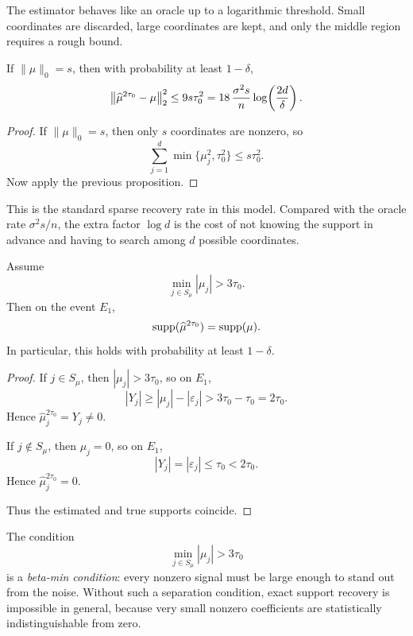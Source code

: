 \begin{remark}
The estimator behaves like an oracle up to a logarithmic threshold. Small coordinates are discarded, large coordinates are kept, and only the middle region requires a rough bound.
\end{remark}

\begin{cor}
If $\|\mu\|_0=s$, then with probability at least $1-\delta$,
\[
\left\lVert\widehat\mu^{2\tau_0}-\mu\right\rVert_2^2
\le
9s\tau_0^2
=
18\,\frac{\sigma^2 s}{n}\log\!\left(\frac{2d}{\delta}\right).
\]
\end{cor}

\begin{proof}
If $\|\mu\|_0=s$, then only $s$ coordinates are nonzero, so
\[
\sum_{j=1}^d \min\{\mu_j^2,\tau_0^2\}
\le
s\tau_0^2.
\]
Now apply the previous proposition.
\end{proof}

\begin{remark}
This is the standard sparse recovery rate in this model.
Compared with the oracle rate $\sigma^2 s/n$, the extra factor $\log d$ is the cost of not knowing the support in advance and having to search among $d$ possible coordinates.
\end{remark}


\begin{cor}
Assume
\[
\min_{j\in S_\mu} |\mu_j| > 3\tau_0.
\]
Then on the event $E_1$,
\[
\operatorname{supp}(\widehat\mu^{2\tau_0})=\operatorname{supp}(\mu).
\]
In particular, this holds with probability at least $1-\delta$.
\end{cor}

\begin{proof}
If $j\in S_\mu$, then $|\mu_j|>3\tau_0$, so on $E_1$,
\[
|Y_j|
\ge
|\mu_j|-|\varepsilon_j|
>
3\tau_0-\tau_0
=
2\tau_0.
\]
Hence $\widehat\mu^{2\tau_0}_j=Y_j\neq 0$.

If $j\notin S_\mu$, then $\mu_j=0$, so on $E_1$,
\[
|Y_j|=|\varepsilon_j|\le \tau_0<2\tau_0.
\]
Hence $\widehat\mu^{2\tau_0}_j=0$.

Thus the estimated and true supports coincide.
\end{proof}

\begin{remark}
The condition
\[
\min_{j\in S_\mu} |\mu_j| > 3\tau_0
\]
is a \emph{beta-min condition}: every nonzero signal must be large enough to stand out from the noise.
Without such a separation condition, exact support recovery is impossible in general, because very small nonzero coefficients are statistically indistinguishable from zero.
\end{remark}

